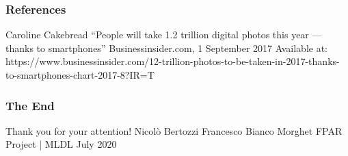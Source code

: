 \documentclass{beamer}
\begin{document}
\begin{frame}
\frametitle{References}
   \begin{thebibliography}{9}
		Caroline Cakebread
		\newblock “People will take 1.2 trillion digital photos this year — thanks to smartphones”
		\newblock Businessinsider.com, 1 September 2017
		\newblock Available at: https://www.businessinsider.com/12-trillion-photos-to-be-taken-in-2017-thanks-to-smartphones-chart-2017-8?IR=T
   \end{thebibliography}
\end{frame}

\begin{frame}
\centering
\frametitle{The End}
\Huge Thank you for your attention!
\break
\break
\break
\break
\large Nicolò Bertozzi
\break
Francesco Bianco Morghet
\break
\break
FPAR Project | MLDL
 July 2020
\end{frame}
\end{document}

